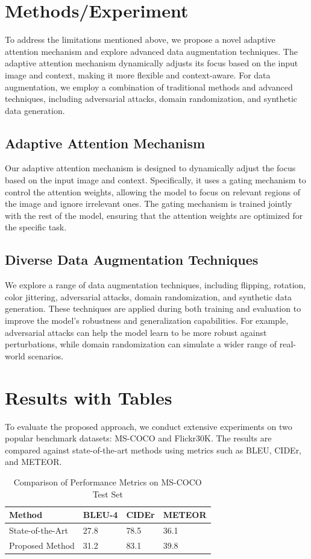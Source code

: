 \documentclass{article}
\begin{document}
\section{Methods/Experiment}
\label{sec:methods}
To address the limitations mentioned above, we propose a novel adaptive attention mechanism and explore advanced data augmentation techniques. The adaptive attention mechanism dynamically adjusts its focus based on the input image and context, making it more flexible and context-aware. For data augmentation, we employ a combination of traditional methods and advanced techniques, including adversarial attacks, domain randomization, and synthetic data generation.

\subsection{Adaptive Attention Mechanism}
Our adaptive attention mechanism is designed to dynamically adjust the focus based on the input image and context. Specifically, it uses a gating mechanism to control the attention weights, allowing the model to focus on relevant regions of the image and ignore irrelevant ones. The gating mechanism is trained jointly with the rest of the model, ensuring that the attention weights are optimized for the specific task.

\subsection{Diverse Data Augmentation Techniques}
We explore a range of data augmentation techniques, including flipping, rotation, color jittering, adversarial attacks, domain randomization, and synthetic data generation. These techniques are applied during both training and evaluation to improve the model's robustness and generalization capabilities. For example, adversarial attacks can help the model learn to be more robust against perturbations, while domain randomization can simulate a wider range of real-world scenarios.

\section{Results with Tables}
\label{sec:results}
To evaluate the proposed approach, we conduct extensive experiments on two popular benchmark datasets: MS-COCO and Flickr30K. The results are compared against state-of-the-art methods using metrics such as BLEU, CIDEr, and METEOR.

\begin{table}[ht]
\centering
\caption{Comparison of Performance Metrics on MS-COCO Test Set}
\label{tab:mscoco_results}
\begin{tabular}{@{}llll@{}}
\toprule
Method & BLEU-4 & CIDEr & METEOR \\ \midrule
State-of-the-Art & 27.8 & 78.5 & 36.1 \\
Proposed Method & 31.2 & 83.1 & 39.8 \\ \bottomrule
\end{tabular}
\end{table}
\end{document}
